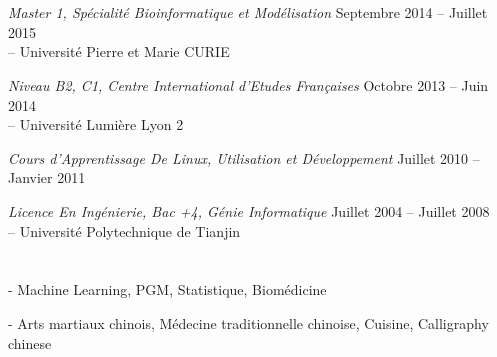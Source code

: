 \documentclass[10pt]{res} %
\begin{document}
\begin{resume}
 
\vspace{0.1in} %


\section{} 

\vspace{8pt} %

{\sl Master 1, Spécialité Bioinformatique et Modélisation} \hfill Septembre 2014 -- Juillet 2015 \\
-- Université Pierre et Marie CURIE 

\vspace{4pt}

{\sl Niveau B2, C1, Centre International d’Etudes Françaises} \hfill Octobre 2013 -- Juin 2014 \\
-- Université Lumière Lyon 2 

\vspace{4pt}

{\sl Cours d’Apprentissage De Linux, Utilisation et Développement} \hfill Juillet 2010 -- Janvier 2011 \\

\vspace{4pt}

{\sl Licence En Ingénierie, Bac +4, Génie Informatique} \hfill Juillet 2004 -- Juillet 2008 \\
-- Université Polytechnique de Tianjin

\vspace{4pt}


\vspace{0.1in} %


\section{}

\vspace{8pt} %

- Machine Learning, PGM, Statistique, Biomédicine

- Arts martiaux chinois, Médecine traditionnelle chinoise, Cuisine, Calligraphy chinese

\end{resume} 
\end{document}
